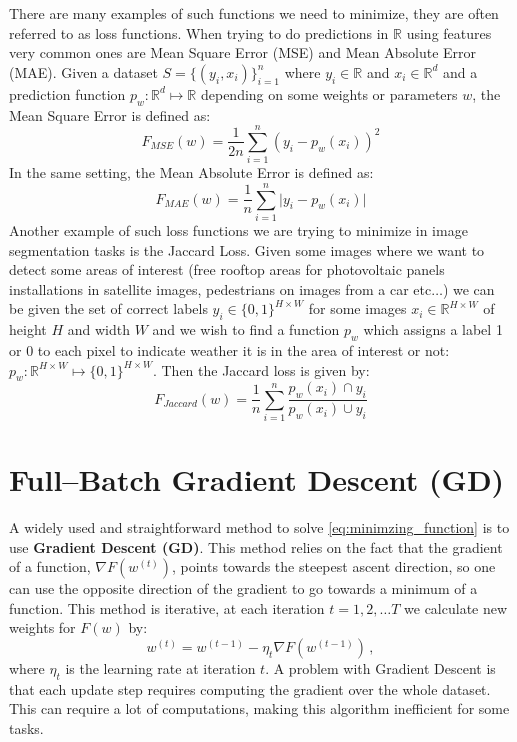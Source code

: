 \documentclass[a4paper,11pt,oneside]{report}
\begin{document}
There are many examples of such functions we need to minimize, they are often referred to as loss functions. When trying to do predictions in $\mathbb{R}$ using features very common ones are Mean Square Error (MSE) and Mean Absolute Error (MAE). Given a dataset $S=\{(y_i, x_i)\}_{i=1}^n$ where $y_i \in \mathbb{R}$ and $x_i \in \mathbb{R}^d$ and a prediction function $p_w : \mathbb{R}^d \mapsto \mathbb{R}$ depending on some weights or parameters $w$, the Mean Square Error is defined as:
$$F_{MSE}(w) = \frac{1}{2n}\sum_{i=1}^n(y_i - p_w(x_i))^2$$
In the same setting, the Mean Absolute Error is defined as:
$$F_{MAE}(w) = \frac{1}{n}\sum_{i=1}^n\mathopen|y_i - p_w(x_i)\mathclose|$$
Another example of such loss functions we are trying to minimize in image segmentation tasks is the Jaccard Loss. Given some images where we want to detect some areas of interest (free rooftop areas for photovoltaic panels installations in satellite images, pedestrians on images from a car etc$\dots$) we can be given the set of correct labels $y_i \in \{0,1\}^{H \times W}$ for some images $x_i \in \mathbb{R}^{H \times W}$ of height $H$ and width $W$ and we wish to find a function $p_w$ which assigns a label 1 or 0 to each pixel to indicate weather it is in the area of interest or not: $p_w : \mathbb{R}^{H \times W} \mapsto \{0,1\}^{H \times W}$. Then the Jaccard loss is given by:
$$F_{Jaccard}(w) = \frac{1}{n}\sum_{i=1}^n \frac{p_w(x_i) \cap y_i}{p_w(x_i) \cup y_i}$$

\section{Full--Batch Gradient Descent (GD)}
A widely used and straightforward method to solve \autoref{eq:minimzing_function} is to use \textbf{Gradient Descent (GD)}. This method relies on the fact that the gradient of a function, $\nabla F(w^{(t)})$, points towards the steepest ascent direction, so one can use the opposite direction of the gradient to go towards a minimum of a function. This method is iterative, at each iteration $t=1,2, \dots T$ we calculate new weights for $F(w)$ by:
\begin{equation}\label{eq:GD}
    w^{(t)} = w^{(t-1)} - \eta_t \nabla F(w^{(t-1)}) \,,
\end{equation}
where $\eta_t$ is the learning rate at iteration $t$.
A problem with Gradient Descent is that each update step requires computing the gradient over the whole dataset. This can require a lot of computations, making this algorithm inefficient for some tasks. 
\end{document}
